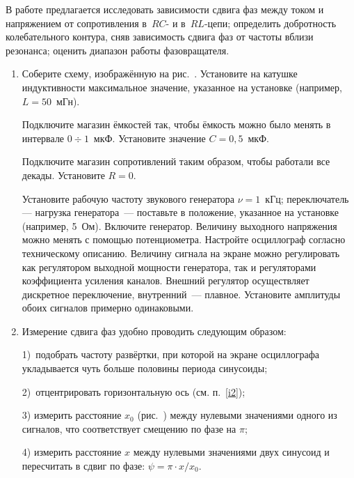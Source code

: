 \begin{lab:task}

	В работе предлагается исследовать зависимости сдвига фаз между током и напряжением от сопротивления в~$RC$- и
	в~$RL$-цепи; определить добротность колебательного контура, сняв зависимость сдвига фаз от частоты вблизи резонанса;
	оценить диапазон работы фазовращателя.
	
	\begin{enumerate}
	
	
	\item Соберите схему, изображённую на рис.~. Установите на катушке индуктивности максимальное значение, указанное на установке (например, ~$L=50$~мГн).
	
	Подключите магазин ёмкостей так, чтобы ёмкость можно было менять в интервале $0\div1$~мкФ. Установите значение $C=0,5$~мкФ.
	
	Подключите магазин сопротивлений таким образом, чтобы работали все декады. Установите $R=0$.
	
	Установите рабочую частоту звукового генератора $\nu=1$~кГц; переключатель--- нагрузка
	генератора~--- поставьте в положение, указанное на установке (например, 5~Ом). Включите генератор. Величину выходного напряжения можно менять с помощью потенциометра. 
	Настройте осциллограф согласно техническому описанию.
	Величину сигнала на экране можно регулировать как регулятором выходной мощности генератора, так и регуляторами
	коэффициента усиления каналов. Внешний регулятор осуществляет дискретное переключение, внутренний~--- плавное.
	Установите амплитуды обоих сигналов примерно одинаковыми.
	
	\item \label{i2} Измерение сдвига фаз удобно проводить следующим образом:
	
	1)~подобрать частоту развёртки, при которой на экране осциллографа укладывается чуть больше половины периода синусоиды;
	
	2)~отцентрировать горизонтальную ось (см. п.~\ref{i2});
	
	3) измерить расстояние $x_0$ (рис.~) между нулевыми значениями одного из сигналов, что соответствует смещению по
	фазе на $\pi$;
	
	4) измерить расстояние $x$ между нулевыми значениями двух синусоид и пересчитать в сдвиг по фазе: $\psi=\pi\cdot x/x_0$.
	
	

\end{enumerate}
\end{lab:task}
